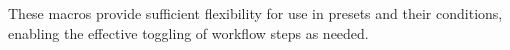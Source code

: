 These macros provide sufficient flexibility for use in presets and their conditions, enabling the effective toggling of workflow steps as needed.


























